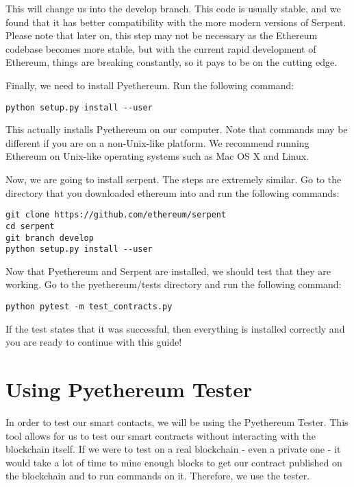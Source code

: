 \documentclass[12pt]{article}
\begin{document}
This will change us into the develop branch. This code is usually stable, and we found that it has better compatibility with the more modern versions of Serpent. Please note that later on, this step may not be necessary as the Ethereum codebase becomes more stable, but with the current rapid development of Ethereum, things are breaking constantly, so it pays to be on the cutting edge.

Finally, we need to install Pyethereum. Run the following command:

\begin{verbatim}
python setup.py install --user
\end{verbatim}

This actually installs Pyethereum on our computer. Note that commands may be different if you are on a non-Unix-like platform. We recommend running Ethereum on Unix-like operating systems such as Mac OS X and Linux.

Now, we are going to install serpent. The steps are extremely similar. Go to the directory that you downloaded ethereum into and run the following commands:

\begin{verbatim}
git clone https://github.com/ethereum/serpent
cd serpent
git branch develop
python setup.py install --user
\end{verbatim}

Now that Pyethereum and Serpent are installed, we should test that they are working. Go to the pyethereum/tests directory and run the following command:

\begin{verbatim}
python pytest -m test_contracts.py
\end{verbatim}

If the test states that it was successful, then everything is installed correctly and you are ready to continue with this guide!

\section{Using Pyethereum Tester}

In order to test our smart contacts, we will be using the Pyethereum Tester. This tool allows for us to test our smart contracts without interacting with the blockchain itself. If we were to test on a real blockchain - even a private one - it would take a lot of time to mine enough blocks to get our contract published on the blockchain and to run commands on it. Therefore, we use the tester.
\end{document}
